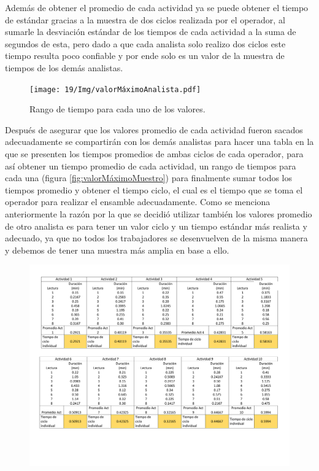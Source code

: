     Además de obtener el promedio de cada actividad ya se puede obtener el tiempo de estándar gracias a la muestra de dos ciclos realizada por el operador, al sumarle la desviación estándar de los tiempos de cada actividad a la suma de segundos de esta, pero dado a que cada analista solo realizo dos ciclos este tiempo resulta poco confiable y por ende solo es un valor de la muestra de tiempos de los demás analistas.
    \begin{figure}[H]
        \centering
        \texttt{[image: 19/Img/valorMáximoAnalista.pdf]}
        \newpage
        \caption{Rango de tiempo para cada uno de los valores.}
        \label{fig:valorMáximoAnalista}    
    \end{figure}
    Después de asegurar que los valores promedio de cada actividad fueron sacados adecuadamente se compartirán con los demás analistas para hacer una tabla en la que se presenten los tiempos promedios de ambas ciclos de cada operador, para así obtener un tiempo promedio de cada actividad, un rango de tiempos para cada una (figura \ref{fig:valorMáximoMuestro}) para finalmente sumar todos los tiempos promedio y obtener el tiempo ciclo, el cual es el tiempo que se toma el operador para realizar el ensamble adecuadamente. Como se menciona anteriormente la razón por la que se decidió utilizar también los valores promedio de otro analista es para tener un valor ciclo y un tiempo estándar más realista y adecuado, ya que no todos los trabajadores se desenvuelven de la misma manera y debemos de tener una muestra más amplia en base a ello.
    \begin{figure}[H]
        \centering
        \includegraphics[trim = {1mm 40mm 1mm 1mm},clip,scale=0.25]{19/Img/tiemposMuestreo1.pdf}
        \newpage
        \label{fig:tiemposMuestreo1 }    
    \end{figure}
